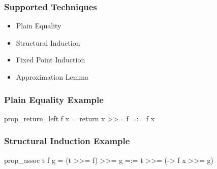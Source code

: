 \documentclass[serif,professionalfont]{beamer}
\begin{document}
\begin{frame}[fragile]
\frametitle{Supported Techniques}
\label{sec-4}
\begin{itemize}

\item Plain Equality \\
\item Structural Induction \\
\item Fixed Point Induction \\
\item Approximation Lemma

%
%
%
%

\end{itemize} %
\end{frame}

\begin{frame}[fragile]
\frametitle{Plain Equality Example}

\begin{code}
prop_return_left f x = return x >>= f =:= f x
\end{code}

\end{frame}

\begin{frame}[fragile]
\frametitle{Structural Induction Example}

\begin{code}
prop_assoc t f g = (t >>= f) >>= g =:=
                   t >>= (\x -> f x >>= g)
\end{code}
\end{frame}
\end{document}
